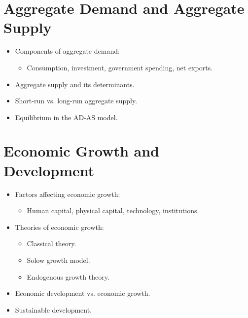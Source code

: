 \section{Aggregate Demand and Aggregate Supply}
\begin{itemize}
    \item Components of aggregate demand:
    \begin{itemize}
        \item Consumption, investment, government spending, net exports.
    \end{itemize}
    \item Aggregate supply and its determinants.
    \item Short-run vs. long-run aggregate supply.
    \item Equilibrium in the AD-AS model.
\end{itemize}

\section{Economic Growth and Development}
\begin{itemize}
    \item Factors affecting economic growth:
    \begin{itemize}
        \item Human capital, physical capital, technology, institutions.
    \end{itemize}
    \item Theories of economic growth:
    \begin{itemize}
        \item Classical theory.
        \item Solow growth model.
        \item Endogenous growth theory.
    \end{itemize}
    \item Economic development vs. economic growth.
    \item Sustainable development.
\end{itemize}

